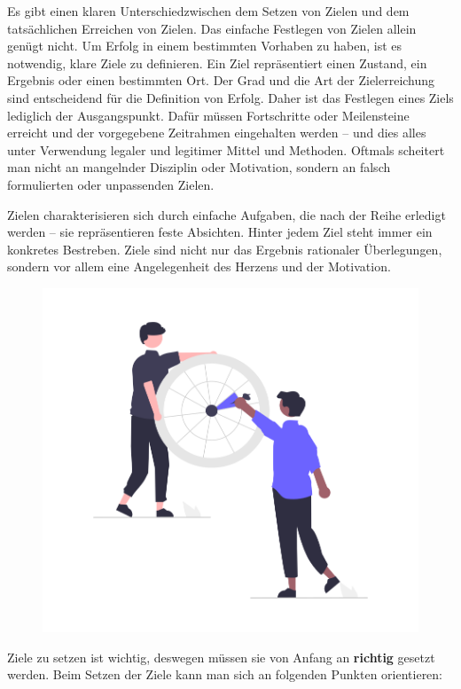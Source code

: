 
Es gibt einen klaren Unterschiedzwischen dem Setzen von Zielen und dem tatsächlichen Erreichen von Zielen.
Das einfache Festlegen von Zielen allein genügt nicht. Um Erfolg in einem bestimmten Vorhaben zu haben,
ist es notwendig, klare Ziele zu definieren. Ein Ziel repräsentiert einen Zustand, ein Ergebnis oder einen
bestimmten Ort. Der Grad und die Art der Zielerreichung sind entscheidend für die Definition von Erfolg. Daher
ist das Festlegen eines Ziels lediglich der Ausgangspunkt. Dafür müssen Fortschritte oder Meilensteine
erreicht und der vorgegebene Zeitrahmen eingehalten werden – und dies alles unter Verwendung legaler und
legitimer Mittel und Methoden. Oftmals scheitert man nicht an mangelnder Disziplin oder Motivation, sondern
an falsch formulierten oder unpassenden Zielen.

Zielen charakterisieren sich durch einfache Aufgaben, die nach der Reihe erledigt werden – sie repräsentieren
feste Absichten. Hinter jedem Ziel steht immer ein konkretes Bestreben.
Ziele sind nicht nur das Ergebnis rationaler Überlegungen, sondern vor allem eine Angelegenheit des Herzens
und der Motivation.\cite{ziele}

\begin{figure}[H]
    \centering
    \includegraphics[height=0.45\textwidth]{./pics/undraw_Target_re_fi8j.png}
    \caption{}
\end{figure}

Ziele zu setzen ist wichtig, deswegen müssen sie von Anfang an \textbf{richtig} gesetzt werden. Beim Setzen der Ziele
kann man sich an folgenden Punkten orientieren: \cite{ziele}

